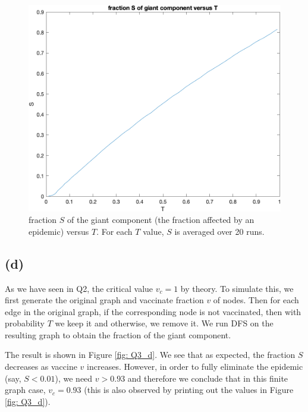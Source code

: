 \documentclass{article}
\begin{document}
\begin{figure}[htp]
	\centering
	\includegraphics[width=.8\linewidth]{figs/Q3_c.png}
	\caption{fraction $ S $ of the giant component (the fraction affected by an epidemic) versus $ T $. For each $ T $ value, $ S $ is averaged over 20 runs.}
	\label{fig: Q3_c}
\end{figure}

\subsection*{(d)}
As we have seen in Q2, the critical value $ v_c = 1 $ by theory. To simulate this, we first generate the original graph and vaccinate fraction $ v $ of nodes. Then for each edge in the original graph, if the corresponding node is not vaccinated, then with probability $ T $ we keep it and otherwise, we remove it. We run DFS on the resulting graph to obtain the fraction of the giant component.

The result is shown in Figure \ref{fig: Q3_d}. We see that as expected, the fraction $ S $ decreases as vaccine $ v $ increases. However, in order to fully eliminate the epidemic (say, $ S < 0.01 $), we need $ v >  0.93 $ and therefore we conclude that in this finite graph case, $ v_c = 0.93 $ (this is also observed by printing out the values in Figure \ref{fig: Q3_d}).
\end{document}
